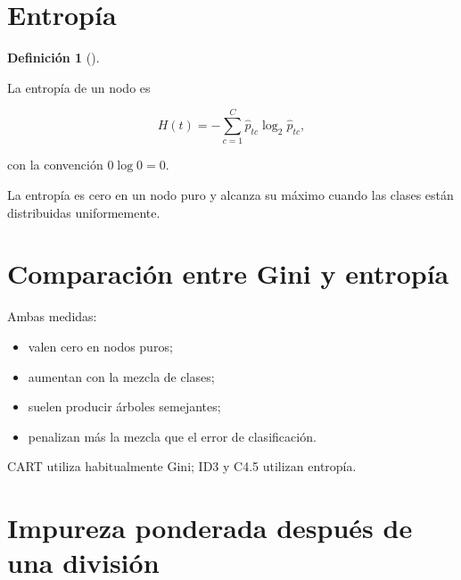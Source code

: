 \documentclass[
  spanish,
  10.5pt,
  letterpaper,
  DIV=11,
  numbers=noendperiod,
  oneside,
  open=any]{scrreprt}
\providecommand{\tightlist}{%
  \setlength{\itemsep}{0pt}\setlength{\parskip}{0pt}}
\theoremstyle{definition}
\newtheorem{definition}{Definición}[chapter]
\theoremstyle{definition}
\theoremstyle{plain}
\theoremstyle{remark}
\begin{document}
\section*{Entropía}\label{entropuxeda}


\begin{definition}[]\protect\hypertarget{def-entropia-arbol}{}\label{def-entropia-arbol}

La entropía de un nodo es

\[
H(t)
=
-
\sum_{c=1}^{C}
\widehat{p}_{tc}
\log_2 \widehat{p}_{tc},
\]

con la convención \(0\log 0=0\).

\end{definition}

La entropía es cero en un nodo puro y alcanza su máximo cuando las
clases están distribuidas uniformemente.

\section*{Comparación entre Gini y
entropía}\label{comparaciuxf3n-entre-gini-y-entropuxeda}


Ambas medidas:

\begin{itemize}
\tightlist
\item
  valen cero en nodos puros;
\item
  aumentan con la mezcla de clases;
\item
  suelen producir árboles semejantes;
\item
  penalizan más la mezcla que el error de clasificación.
\end{itemize}

CART utiliza habitualmente Gini; ID3 y C4.5 utilizan entropía.

\section*{Impureza ponderada después de una
división}\label{impureza-ponderada-despuuxe9s-de-una-divisiuxf3n}

\end{document}
